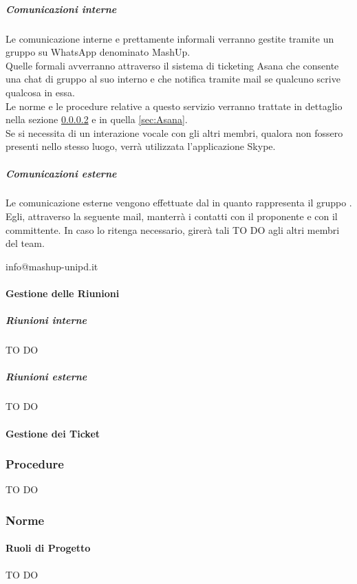 				\subparagraph{Comunicazioni interne}
Le comunicazione interne e prettamente informali verranno gestite tramite un gruppo su WhatsApp denominato MashUp. \\
Quelle formali avverranno attraverso il sistema di ticketing Asana che consente una chat di gruppo al suo interno e che notifica tramite mail se qualcuno scrive qualcosa in essa. \\
Le norme e le procedure relative a questo servizio verranno trattate in dettaglio nella sezione \ref{sec:gestione_dei_ticket} e in quella \ref{sec:Asana}. \\
Se si necessita di un interazione vocale con gli altri membri, qualora non fossero presenti nello stesso luogo, verrà utilizzata l'applicazione Skype.
				\subparagraph{Comunicazioni esterne}
Le comunicazione esterne vengono effettuate dal \roleProjectManager{} in quanto rappresenta il gruppo \groupName. \\
Egli, attraverso la seguente mail, manterrà i contatti con il proponente e con il committente. In caso lo ritenga necessario, girerà tali TO DO agli altri membri del team.
					\begin{center}
						info@mashup-unipd.it
					\end{center}
					
			\paragraph{Gestione delle Riunioni}
				\subparagraph{Riunioni interne}
TO DO
				\subparagraph{Riunioni esterne}
TO DO			

			\paragraph{Gestione dei Ticket} \label{sec:gestione_dei_ticket}
			
			
		\subsubsection{Procedure}
TO DO
		\subsubsection{Norme}

			\paragraph{Ruoli di Progetto}
TO DO
	
	
	
